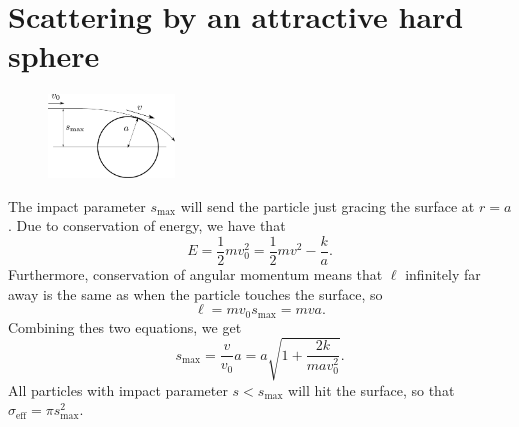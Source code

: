 \documentclass{article}
\begin{document}
    \section{Scattering by an attractive hard sphere}
        \begin{figure}
            \vspace{-0.7cm}
            \includegraphics[width=0.3\textwidth]{figures/figure_3.pdf}
            \vspace{-1.3cm}
        \end{figure}
        The impact parameter $s_\mathrm{max}$ will send the particle just gracing the surface at $r=a$. Due to conservation of energy, we have that 
        \begin{equation*}
            E = \frac{1}{2} m v_0^2 = \frac{1}{2}mv^2 - \frac{k}{a}.
        \end{equation*}
        Furthermore, conservation of angular momentum means that $\ell$ infinitely far away is the same as when the particle touches the surface, so
        \begin{equation*}
            \ell = m v_0 s_\mathrm{max} = mva.
        \end{equation*}
        Combining thes two equations, we get
        \begin{equation*}
            s_\mathrm{max} = \frac{v}{v_0}a = a \sqrt{1 + \frac{2 k}{m a v_0^2}}.
        \end{equation*}
        All particles with impact parameter $s < s_\mathrm{max}$ will hit the surface, so that $\sigma_\mathrm{eff} = \pi s_\mathrm{max}^2$.
\end{document}

